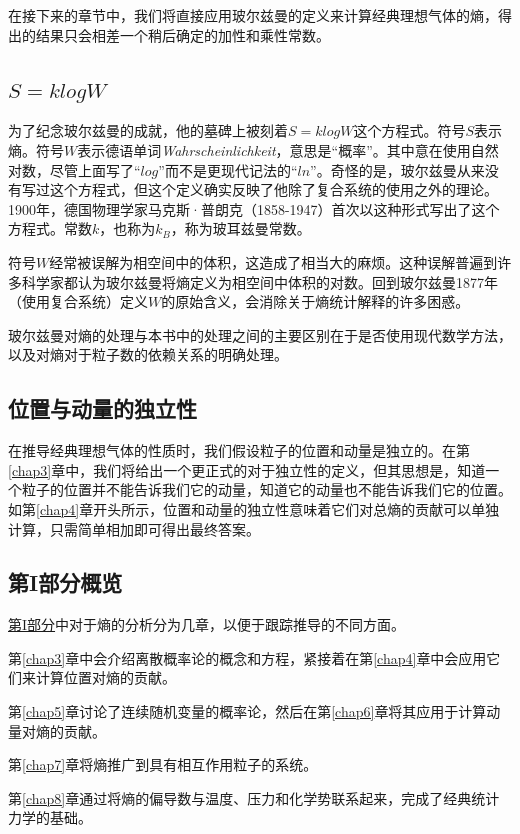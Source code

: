 \documentclass[UTF8]{ctexart}
\numberwithin{equation}{section}%
\numberwithin{figure}{section}%
\begin{document}
    在接下来的章节中，我们将直接应用玻尔兹曼的定义来计算经典理想气体的熵，得出的结果只会相差一个稍后确定的加性和乘性常数。
    
    \subsection{\texorpdfstring{$S=klogW$}{S=klogW}}
    为了纪念玻尔兹曼的成就，他的墓碑上被刻着$S=k logW$这个方程式。符号$S$表示熵。符号$W$表示德语单词\textit{Wahrscheinlichkeit}，意思是“概率”。其中意在使用自然对数，尽管上面写了“$log$”而不是更现代记法的“$ln$”。奇怪的是，玻尔兹曼从来没有写过这个方程式，但这个定义确实反映了他除了复合系统的使用之外的理论。1900年，德国物理学家马克斯·普朗克（1858-1947）首次以这种形式写出了这个方程式。常数$k$，也称为$k_B$，称为玻耳兹曼常数。

    符号$W$经常被误解为相空间中的体积，这造成了相当大的麻烦。这种误解普遍到许多科学家都认为玻尔兹曼将熵定义为相空间中体积的对数。回到玻尔兹曼1877年（使用复合系统）定义$W$的原始含义，会消除关于熵统计解释的许多困惑。

    玻尔兹曼对熵的处理与本书中的处理之间的主要区别在于是否使用现代数学方法，以及对熵对于粒子数的依赖关系的明确处理。

    \subsection{位置与动量的独立性}

    在推导经典理想气体的性质时，我们假设粒子的位置和动量是独立的。在第\ref{chap3}章中，我们将给出一个更正式的对于独立性的定义，但其思想是，知道一个粒子的位置并不能告诉我们它的动量，知道它的动量也不能告诉我们它的位置。
    如第\ref{chap4}章开头所示，位置和动量的独立性意味着它们对总熵的贡献可以单独计算，只需简单相加即可得出最终答案。

    \subsection{第I部分概览}
    \hyperref[part1]{第I部分}中对于熵的分析分为几章，以便于跟踪推导的不同方面。

    第\ref{chap3}章中会介绍离散概率论的概念和方程，紧接着在第\ref{chap4}章中会应用它们来计算位置对熵的贡献。
    
    第\ref{chap5}章讨论了连续随机变量的概率论，然后在第\ref{chap6}章将其应用于计算动量对熵的贡献。
    
    第\ref{chap7}章将熵推广到具有相互作用粒子的系统。
    
    第\ref{chap8}章通过将熵的偏导数与温度、压力和化学势联系起来，完成了经典统计力学的基础。
    
\end{document}
